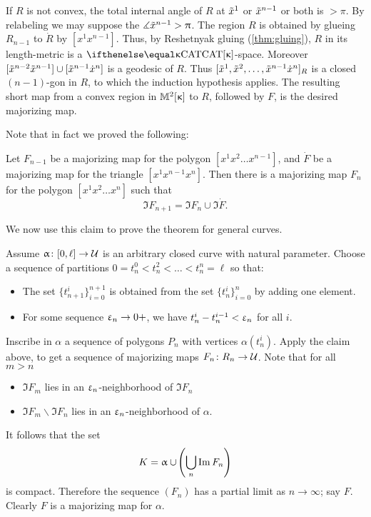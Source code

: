 If $R$ is not convex,  the total internal angle of $R$ at $\~x^1$ or $ \~x^{n-1} $ or both is $>\pi$.  
By relabeling we may suppose the  $\mangle\~x^{n-1}>\pi$.  
The region $R$ is obtained by glueing $R_{n-1}$ to $\dot R$ by $[x^1x^{n-1}]$.
Thus, by Reshetnyak gluing (\ref{thm:gluing}), $R$ in its length-metric is a $\CAT{\kappa}$-space.  
Moreover $[\~x^{n-2}\~x^{n-1}]\cup[\~x^{n-1} \dot x^n]$ is a geodesic of $R$.
Thus $[\~x^1, \~x^2, \dots, \~x^{n-1} \dot x^n]_R$ is a closed $(n-1)$-gon in $R$, to which the induction hypothesis applies. The resulting short map from a convex region in $ \Lob2\kappa$ to $R$, followed by $F$,  is the desired majorizing map.

Note that in fact we proved the following:

\begin{clm}{}
Let $F_{n-1}$ be a majorizing map for the polygon $[x^1x^2\dots x^{n-1}]$,
and $\dot F$ be a majorizing map for the triangle $[x^1x^{n-1}x^{n}]$.
Then there is a majorizing map $F_n$ for the polygon $[x^1x^2\dots x^n]$
such that \[\Im F_{n+1}= \Im F_n\cup\Im \dot F.\]

\end{clm}

We now use this claim to prove the theorem for general curves.

Assume $\alpha\:[0,\ell]\to\spc{U}$ is an  arbitrary closed curve with natural parameter.
Choose a sequence of partitions $0=t^0_n<t^2_n<\dots<t^n_n=\ell$
so that:
\begin{itemize}
\item The set $\{t_{n+1}^i\}_{i=0}^{n+1}$ 
is obtained from the set  $\{t_n^i\}_{i=0}^n$ by adding one element.
\item For some sequence $\eps_n\to0+$,
we have $t^i_n-t^{i-1}_n<\eps_n$ for all $i$.
\end{itemize}

Inscribe in $\alpha$ a sequence of polygons $P_n$ with vertices $\alpha(t^i_n)$.
Apply the claim above, to get a sequence of majorizing maps $F_n\:R_n\to\spc{U}$.
Note that for all $m>n$
\begin{itemize}
\item $\Im F_m$ lies in an  $\eps_n$-neighborhood of $\Im F_n$
\item $\Im F_m\backslash \Im F_n$ lies in an  $\eps_n$-neighborhood of $\alpha$.
\end{itemize}
It follows that the set
\[K=\alpha\cup\l(\bigcup_n\Im F_n\r)\]
is compact.
Therefore the sequence $(F_n)$
has a partial limit as $n\to\infty$; 
say $F$.
Clearly $F$ is a majorizing map for $\alpha$.
\qeds

